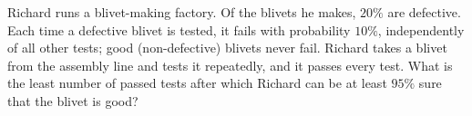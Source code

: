 Richard runs a blivet-making factory. Of the blivets he makes, $20\%$ are defective. Each time a defective blivet is tested, it fails with probability $10\%$, independently of all other tests; good (non-defective) blivets never fail. Richard takes a blivet from the assembly line and tests it repeatedly, and it passes every test. What is the least number of passed tests after which Richard can be at least $95\%$ sure that the blivet is good?
